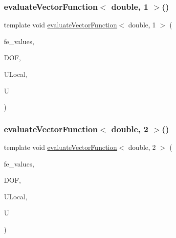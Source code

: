 \mbox{\label{function_evaluations_8cc_adab42860d3e6d233bc937b4574606f60}} 
\subsubsection{\texorpdfstring{evaluateVectorFunction$<$ double, 1 $>$()}{evaluateVectorFunction< double, 1 >()}}
{\footnotesize\ttfamily template void \mbox{\hyperlink{group___evaluation_functions_gab9e164be1be244df81c932426a4bd513}{evaluate\+Vector\+Function}}$<$ double, 1 $>$ (\begin{DoxyParamCaption}\item[{const F\+E\+Values$<$ 1 $>$ \&}]{fe\+\_\+values,  }\item[{unsigned int}]{D\+OF,  }\item[{Table$<$ 1, double $>$ \&}]{U\+Local,  }\item[{Table$<$ 2, double $>$ \&}]{U }\end{DoxyParamCaption})}

\mbox{\label{function_evaluations_8cc_a418401c6810307bd7073ff5f72b3bd77}} 
\subsubsection{\texorpdfstring{evaluateVectorFunction$<$ double, 2 $>$()}{evaluateVectorFunction< double, 2 >()}}
{\footnotesize\ttfamily template void \mbox{\hyperlink{group___evaluation_functions_gab9e164be1be244df81c932426a4bd513}{evaluate\+Vector\+Function}}$<$ double, 2 $>$ (\begin{DoxyParamCaption}\item[{const F\+E\+Values$<$ 2 $>$ \&}]{fe\+\_\+values,  }\item[{unsigned int}]{D\+OF,  }\item[{Table$<$ 1, double $>$ \&}]{U\+Local,  }\item[{Table$<$ 2, double $>$ \&}]{U }\end{DoxyParamCaption})}

\mbox{\label{function_evaluations_8cc_af05742550c00c35879af970241b9f6fc}} 
